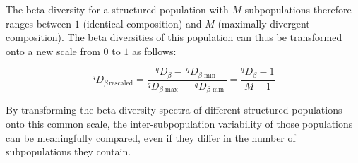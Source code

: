 \noindent The beta diversity for a structured population with $M$ subpopulations therefore ranges between $1$ (identical composition) and $M$ (maximally-divergent composition). The beta diversities of this population can thus be transformed onto a new scale from $0$ to $1$ as follows:

\begin{equation}
^qD_{\beta\,\mathrm{rescaled}} = \frac{^qD_\beta -\:^qD_{\beta\min}}{^qD_{\beta\max} -\: ^qD_{\beta\min}} = \frac{^qD_\beta - 1}{M - 1}
\label{eq:diversity_beta_rescale}
\end{equation}

\noindent By transforming the beta diversity spectra of different structured populations onto this common scale, the inter-subpopulation variability of those populations can be meaningfully compared, even if they differ in the number of subpopulations they contain.